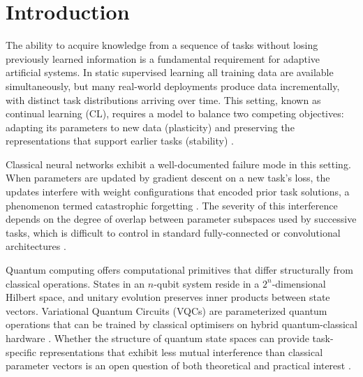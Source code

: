 \documentclass[acmlarge]{acmart}
\begin{document}

\maketitle

\section{Introduction}

The ability to acquire knowledge from a sequence of tasks without losing previously learned information is a fundamental requirement for adaptive artificial systems.
In static supervised learning all training data are available simultaneously, but many real-world deployments produce data incrementally, with distinct task distributions arriving over time.
This setting, known as continual learning (CL), requires a model to balance two competing objectives: adapting its parameters to new data (plasticity) and preserving the representations that support earlier tasks (stability) \cite{Parisi2019}.

Classical neural networks exhibit a well-documented failure mode in this setting.
When parameters are updated by gradient descent on a new task's loss, the updates interfere with weight configurations that encoded prior task solutions, a phenomenon termed catastrophic forgetting \cite{McCloskey1989,French1999}.
The severity of this interference depends on the degree of overlap between parameter subspaces used by successive tasks, which is difficult to control in standard fully-connected or convolutional architectures \cite{Kirkpatrick2017}.

Quantum computing offers computational primitives that differ structurally from classical operations.
States in an $n$-qubit system reside in a $2^n$-dimensional Hilbert space, and unitary evolution preserves inner products between state vectors.
Variational Quantum Circuits (VQCs) are parameterized quantum operations that can be trained by classical optimisers on hybrid quantum-classical hardware \cite{Cerezo2021}.
Whether the structure of quantum state spaces can provide task-specific representations that exhibit less mutual interference than classical parameter vectors is an open question of both theoretical and practical interest \cite{Biamonte2017,RODRIGUEZ26}.
\end{document}
